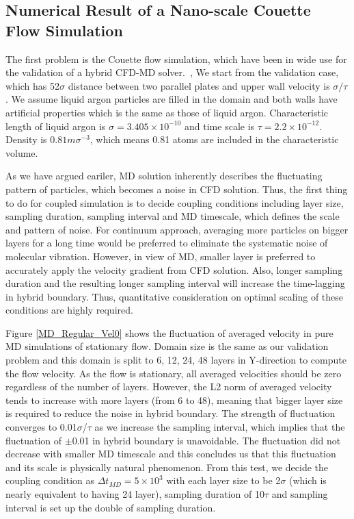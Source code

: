 \documentclass[conference,final]{IEEEtran}
\begin{document}
\subsection{Numerical Result of a Nano-scale Couette Flow Simulation}


The first problem is the Couette flow simulation, which have been in wide use for the validation of a hybrid CFD-MD solver.~\cite{Nie},\cite{Yen} We start from the validation case, which has 52$\sigma$ distance between two parallel plates and upper wall velocity is ${\sigma}/{\tau}$. We assume liquid argon particles are filled in the domain and both walls have artificial properties which is the same as those of liquid argon. Characteristic length of liquid argon is ${\sigma}=3.405{\times}10^{-10}$ and time scale is $\tau=2.2{\times}10^{-12}$. Density is $0.81m{\sigma}^{-3}$, which means 0.81 atoms are included in the characteristic volume.

As we have argued eariler, MD solution inherently describes the fluctuating pattern of particles, which becomes a noise in CFD solution. Thus, the first thing to do for coupled simulation is to decide coupling conditions including layer size, sampling duration, sampling interval and MD timescale, which defines the scale and pattern of noise. For continuum approach, averaging more particles on bigger layers for a long time would be preferred to eliminate the systematic noise of molecular vibration. However, in view of MD, smaller layer is preferred to accurately apply the velocity gradient from CFD solution. Also, longer sampling duration and the resulting longer sampling interval will increase the time-lagging in hybrid boundary. Thus, quantitative consideration on optimal scaling of these conditions are highly required.

Figure \ref{MD_Regular_Vel0} shows the fluctuation of averaged velocity in pure MD simulations of stationary flow. Domain size is the same as our validation problem and this domain is split to 6, 12, 24, 48 layers in Y-direction to compute the flow velocity. As the flow is stationary, all averaged velocities should be zero regardless of the number of layers. However, the L2 norm of averaged velocity tends to increase with more layers (from 6 to 48), meaning that bigger layer size is required to reduce the noise in hybrid boundary. The strength of fluctuation converges to 0.01$\sigma$/$\tau$ as we increase the sampling interval, which implies that the fluctuation of $\pm$0.01 in hybrid boundary is unavoidable. The fluctuation did not decrease with smaller MD timescale and this concludes us that this fluctuation and its scale is physically natural phenomenon. From this test, we decide the coupling condition as $\Delta{t_{MD}}=5\times{10^{3}}$ with each layer size to be 2$\sigma$ (which is nearly equivalent to having 24 layer), sampling duration of 10$\tau$ and sampling interval is set up the double of sampling duration.
\end{document}
